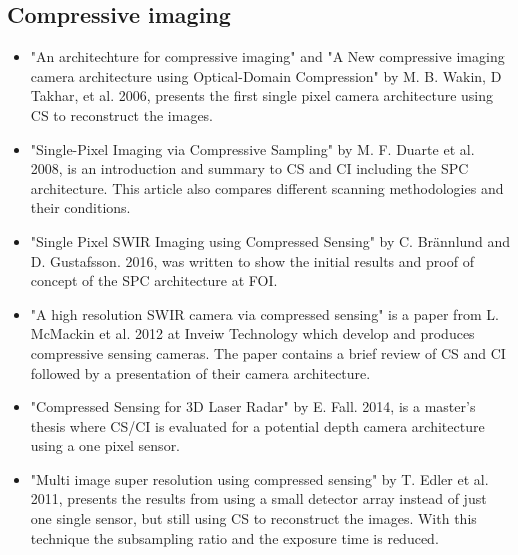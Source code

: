 \subsection{Compressive imaging}
\begin{itemize}

\item \cite{article:an_Arcitecture_for_CI,article:a_new_ci_arc} "An architechture for compressive imaging" and "A New compressive imaging camera architecture using Optical-Domain Compression" by M. B. Wakin, D Takhar, et al. 2006, presents the first single pixel camera architecture using CS to reconstruct the images. 

\item \cite{article:single_pixel_im_cs} "Single-Pixel Imaging via Compressive Sampling" by M. F. Duarte et al. 2008, is an introduction and summary to CS and CI including the SPC architecture. This article also compares different scanning methodologies and their conditions.   

\item \cite{article:foiSPIS} "Single Pixel SWIR Imaging using Compressed Sensing" by C. Brännlund and D. Gustafsson. 2016, was written to show the initial results and proof of concept of the SPC architecture at FOI.
  


\item \cite{article:a_high_res_swir} "A high resolution SWIR camera via compressed sensing" is a paper from L. McMackin et al. 2012 at Inveiw Technology which develop and produces compressive sensing cameras. The paper contains a brief review of CS and CI followed by a presentation of their camera architecture. 

 
\item \cite{mt:EF} "Compressed Sensing for 3D Laser Radar" by E. Fall. 2014, is a master's thesis where CS/CI is evaluated for a potential depth camera architecture using a one pixel sensor.   

\item \cite{article:misuperres} "Multi image super resolution using compressed sensing" by T. Edler et al. 2011, presents the results from using a small detector array instead of just one single sensor, but still using CS to reconstruct the images. With this technique the subsampling ratio and the exposure time is reduced. 

 
	
\end{itemize}
    
